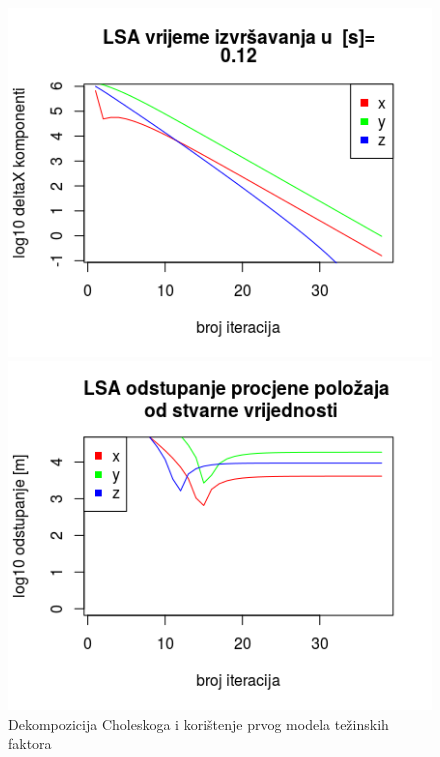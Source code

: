 \documentclass[a4paper,twoside,12pt]{memoir} %
\begin{document}
\begin{figure}[H]
	\begin{minipage}{0.48\textwidth}
		\centering
		\includegraphics[width=1\textwidth]{3LSAdelta1l10b}
	\end{minipage}%
	\hspace{1cm}
	\begin{minipage}{0.48\textwidth}
		
		\includegraphics[width=1\textwidth]{3LSAreal1l10b}
	\end{minipage}%
	\caption{Dekompozicija Choleskoga i korištenje prvog modela težinskih faktora}
	\label{fig:3LSA1Ch}
\end{figure}
\end{document}
